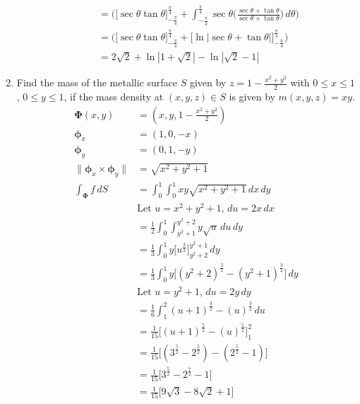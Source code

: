 \documentclass{article}
\newcommand{\norm}[1]{\| #1 \|}
\begin{document}
\begin{enumerate}
\begin{enumerate}
\begin{align*}
             &= \Big( \Big[ \sec \theta \tan \theta \Big]_{-\frac{\pi}{4}}^{\frac{\pi}{4}} + \int_{-\frac{\pi}{4}}^{\frac{\pi}{4}} \sec \theta \Big( \frac{\sec \theta + \tan \theta}{\sec \theta + \tan \theta}\Big)\, d \theta \Big) \\
             &= \Big( \Big[ \sec \theta \tan \theta \Big]_{-\frac{\pi}{4}}^{\frac{\pi}{4}} + \Big[\ln|\sec \theta + \tan \theta |\Big]_{-\frac{\pi}{4}}^{\frac{\pi}{4}} \Big) \\
             &= 2\sqrt2 + \ln |1 + \sqrt2| - \ln |\sqrt2 -1|
        \end{align*} 
    \end{enumerate}
    \newpage
    \item Find the mass of the metallic surface $S$ given by $\displaystyle z = 1 - \frac{x^2 + y^2}{2}$ with $0 \leq x \leq 1$, $0 \leq y \leq 1$, if the mass density at $(x,y,z) \in S$ is given by $m(x,y,z) = xy$.
    \begin{align*}
        \boldsymbol \Phi(x,y) &= (x,y,1 - \frac{x^2 + y^2}{2})\\
        \boldsymbol \phi_x &= (1,0,- x)\\
        \boldsymbol \phi_y &= (0,1,- y)\\
        \norm{\boldsymbol \phi_x \times \boldsymbol \phi_y }&= \sqrt{x^2 + y^2 + 1} \\
        \int_{\boldsymbol \Phi} f\, dS &= \int_0^1 \int_0^1 xy \sqrt{x^2 + y^2 + 1} \, dx \, dy \\
        &\text{Let }u = x^2 + y^2 + 1 ,\, du = 2x \, dx\\
        &= \frac{1}{2}\int_0^1 \int_{y^2+1}^{y^2 + 2} y \sqrt{u} \, du \, dy \\
        &= \frac{1}{3}\int_0^1 y\Big[u^{\frac{3}{2}}\Big]_{y^2+2}^{y^2 + 1} \, dy \\
        &= \frac{1}{3}\int_0^1 y\Big[(y^2+2)^{\frac{3}{2}} - (y^2+1)^{\frac{3}{2}}\Big]\, dy \\
        &\text{Let }u = y^2 + 1 ,\, du = 2y \, dy \\
        &= \frac{1}{6}\int_1^2 (u+1)^{\frac{3}{2}} - (u)^{\frac{3}{2}}\, du \\
        &= \frac{1}{15} \Big[(u+1)^{\frac{5}{2}} - (u)^{\frac{5}{2}}\Big]_1^2 \\
        &= \frac{1}{15} \Big[(3^{\frac{5}{2}} - 2^{\frac{5}{2}}) - (2^{\frac{5}{2}} - 1)\Big]\\
        &= \frac{1}{15} \Big[3^{\frac{5}{2}} - 2^{\frac{7}{2}} - 1\Big]\\
        &= \frac{1}{15} \Big[9\sqrt{3} - 8 \sqrt{2} + 1\Big]\\
    \end{align*} 
\end{enumerate}
\end{document}
